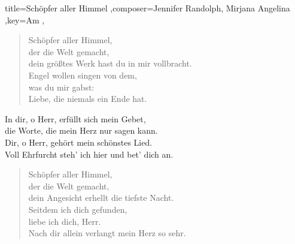 \documentclass[]{leadsheet}
\begin{document}
\begin{song}{title={Schöpfer aller Himmel
},composer={Jennifer Randolph, Mirjana Angelina
},key={Am
},}
\begin{verse}
Schöpfer aller Himmel, \\
der die Welt gemacht, \\
dein größtes Werk hast du in mir vollbracht. \\
Engel wollen singen von dem, \\
was du mir gabst: \\
Liebe, die niemals ein Ende hat. \\
\end{verse}

\begin{chorus}
In dir, o Herr, erfüllt sich mein Gebet, \\
die Worte, die mein Herz nur sagen kann. \\
Dir, o Herr, gehört mein schönstes Lied. \\
Voll Ehrfurcht steh' ich hier und bet' dich an. \\
\end{chorus}

\begin{verse}
Schöpfer aller Himmel, \\
der die Welt gemacht, \\
dein Angesicht erhellt die tiefste Nacht. \\
Seitdem ich dich gefunden, \\
liebe ich dich, Herr. \\
Nach dir allein verlangt mein Herz so sehr. \\
\end{verse}

\end{song}
\end{document}

